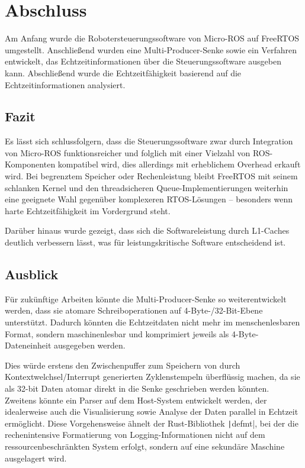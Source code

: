 \section{Abschluss}

Am Anfang wurde die Robotersteuerungssoftware von Micro-ROS auf FreeRTOS
umgestellt. Anschließend wurden eine Multi-Producer-Senke sowie ein Verfahren
entwickelt, das Echtzeitinformationen über die Steuerungssoftware ausgeben kann.
Abschließend wurde die Echtzeitfähigkeit basierend auf die Echtzeitinformationen
analysiert.

\subsection{Fazit}

Es lässt sich schlussfolgern, dass die Steuerungssoftware zwar durch Integration
von Micro-ROS funktionsreicher und folglich mit einer Vielzahl von
ROS-Komponenten kompatibel wird, dies allerdings mit erheblichem Overhead
erkauft wird. Bei begrenztem Speicher oder Rechenleistung bleibt FreeRTOS mit
seinem schlanken Kernel und den threadsicheren Queue-Implementierungen weiterhin
eine geeignete Wahl gegenüber komplexeren RTOS-Lösungen -- besonders wenn harte
Echtzeitfähigkeit im Vordergrund steht.

Darüber hinaus wurde gezeigt, dass sich die Softwareleistung durch L1-Caches
deutlich verbessern lässt, was für leistungskritische Software entscheidend ist.

\subsection{Ausblick}

Für zukünftige Arbeiten könnte die Multi-Producer-Senke so weiterentwickelt
werden, dass sie atomare Schreiboperationen auf 4-Byte-/32-Bit-Ebene
unterstützt. Dadurch könnten die Echtzeitdaten nicht mehr im menschenlesbaren
Format, sondern maschinenlesbar und komprimiert jeweils als 4-Byte-Dateneinheit
ausgegeben werden.

Dies würde erstens den Zwischenpuffer zum Speichern von durch
Kontextwelchsel/Interrupt generierten Zyklenstempeln überflüssig machen, da sie
als 32-bit Daten atomar direkt in die Senke geschrieben werden könnten. Zweitens
könnte ein Parser auf dem Host-System entwickelt werden, der idealerweise auch
die Visualisierung sowie Analyse der Daten parallel in Echtzeit ermöglicht.
Diese Vorgehensweise ähnelt der Rust-Bibliothek \texttt|defmt|, bei
der die rechenintensive Formatierung von Logging-Informationen nicht auf dem
ressourcenbeschränkten System erfolgt, sondern auf eine sekundäre Maschine
ausgelagert wird.
